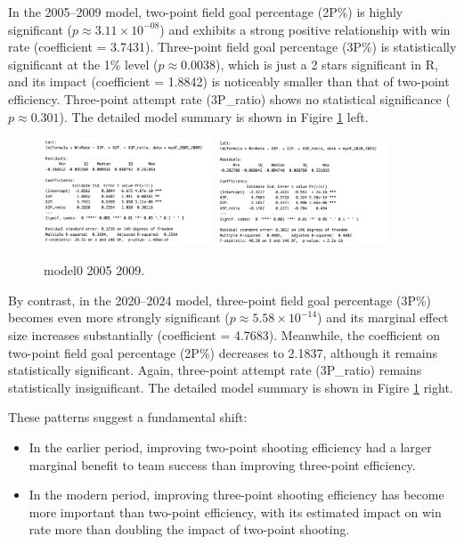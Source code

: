 \documentclass[11pt, a4paper]{article} %
\begin{document}
In the 2005--2009 model, two-point field goal percentage (2P\%) is highly significant ($p \approx 3.11\times 10^{-08}$) and exhibits a strong positive 
relationship with win rate (coefficient = 3.7431). Three-point field goal percentage (3P\%) is statistically significant at the 1\% level 
($p \approx 0.0038$), which is just a 2 stars significant in R, and its impact (coefficient = 1.8842) is noticeably smaller than that of two-point 
efficiency. Three-point attempt rate (3P\_ratio) shows no statistical significance ($p \approx 0.301$). The detailed model summary is shown in 
Figire \ref{fig:model0_2005_2009} left.
\begin{figure}[htbp]
    \centering
    \includegraphics[width=0.45\textwidth]{figure/model0_2005_2009.png}
    \includegraphics[width=0.45\textwidth]{figure/model0_2020_2024.png}
    \caption{model0 2005 2009.}
    \label{fig:model0_2005_2009}
\end{figure}

By contrast, in the 2020--2024 model, three-point field goal percentage (3P\%) becomes even more strongly significant ($p \approx 5.58 \times 10^{-14}$) 
and its marginal effect size increases substantially (coefficient = 4.7683). Meanwhile, the coefficient on two-point field goal percentage 
(2P\%) decreases to 2.1837, although it remains statistically significant. Again, three-point attempt rate (3P\_ratio) remains statistically 
insignificant. The detailed model summary is shown in Figire \ref{fig:model0_2005_2009} right.

These patterns suggest a fundamental shift:
\begin{itemize}
    \item In the earlier period, improving two-point shooting efficiency had a larger marginal benefit to team success than improving three-point 
    efficiency.
    \item In the modern period, improving three-point shooting efficiency has become more important than two-point efficiency, with its estimated 
    impact on win rate more than doubling the impact of two-point shooting.
\end{itemize}
\end{document}
